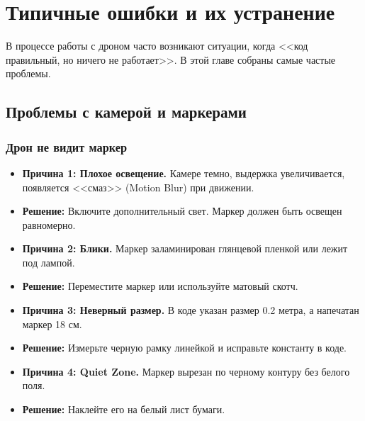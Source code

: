 \section{Типичные ошибки и их устранение}

В процессе работы с дроном часто возникают ситуации, когда <<код правильный, но ничего не работает>>. В этой главе собраны самые частые проблемы.

\subsection{Проблемы с камерой и маркерами}

\subsubsection{Дрон не видит маркер}
\begin{itemize}
    \item \textbf{Причина 1: Плохое освещение.} Камере темно, выдержка увеличивается, появляется <<смаз>> (Motion Blur) при движении.
    \item \textbf{Решение:} Включите дополнительный свет. Маркер должен быть освещен равномерно.
    
    \item \textbf{Причина 2: Блики.} Маркер заламинирован глянцевой пленкой или лежит под лампой.
    \item \textbf{Решение:} Переместите маркер или используйте матовый скотч.
    
    \item \textbf{Причина 3: Неверный размер.} В коде указан размер 0.2 метра, а напечатан маркер 18 см.
    \item \textbf{Решение:} Измерьте черную рамку линейкой и исправьте константу в коде.
    
    \item \textbf{Причина 4: Quiet Zone.} Маркер вырезан по черному контуру без белого поля.
    \item \textbf{Решение:} Наклейте его на белый лист бумаги.
\end{itemize}

